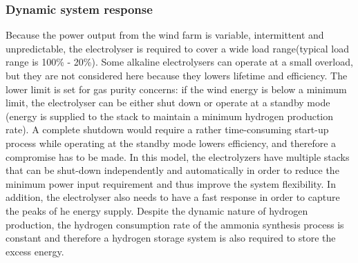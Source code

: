 \subsubsection{Dynamic system response}
Because the power output from the wind farm is variable, intermittent and unpredictable, the electrolyser is required to cover a wide load range(typical load range is 100\% - 20\%). Some alkaline electrolysers can operate at a small overload, but they are not considered here because they lowers lifetime and efficiency. The lower limit is set for gas purity concerns: if the wind energy is below a minimum limit, the electrolyser can be either shut down or operate at a standby mode (energy is supplied to the stack to maintain a minimum hydrogen production rate). A complete shutdown would require a rather time-consuming start-up process while operating at the standby mode lowers efficiency, and therefore a compromise has to be made. In this model, the electrolyzers have multiple stacks that can be shut-down independently and automatically in order to reduce the minimum power input requirement and thus improve the system flexibility.  In addition, the electrolyser also needs to have a fast response in order to capture the peaks of he energy supply. Despite the dynamic nature of hydrogen production, the hydrogen consumption rate of the ammonia synthesis process is constant and therefore a hydrogen storage system is also required to store the excess energy. \cite{purity}\cite{gas} 
